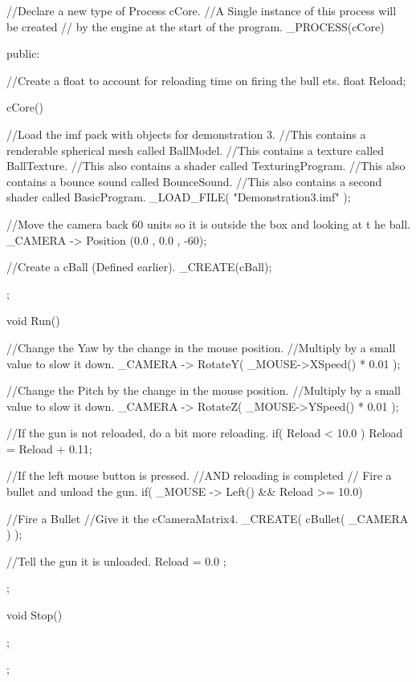 \begin{DoxyCode}
//Declare a new type of Process cCore.
//A Single instance of this process will be created
// by the engine at the start of the program.
_PROCESS(cCore)
{
public:

                //Create a float to account for reloading time on firing the bull
      ets.
        float Reload;

        cCore()
        {
        //Load the imf pack with objects for demonstration 3.
        //This contains a renderable spherical mesh called BallModel.
        //This contains a texture called BallTexture.
        //This also contains a shader called TexturingProgram.
        //This also contains a bounce sound called BounceSound.
        //This also contains a second shader called BasicProgram.
         _LOAD_FILE( "Demonstration3.imf" );

        //Move the camera back 60 units so it is outside the box and looking at t
      he ball.
        _CAMERA -> Position (0.0 , 0.0 , -60);

        //Create a cBall (Defined earlier).
         _CREATE(cBall);

        };

        void Run()
        {
                //Change the Yaw by the change in the mouse position.
                //Multiply by a small value to slow it down.
                _CAMERA -> RotateY( _MOUSE->XSpeed() * 0.01 );

                //Change the Pitch by the change in the mouse position.
                //Multiply by a small value to slow it down.
                _CAMERA -> RotateZ( _MOUSE->YSpeed() * 0.01 );

                //If the gun is not reloaded, do a bit more reloading.
                if( Reload < 10.0 ) { Reload = Reload + 0.11; }

                //If the left mouse button is pressed.
                //AND reloading is completed
                // Fire a bullet and unload the gun.
                if( _MOUSE -> Left() && Reload >= 10.0)
                {
                        //Fire a Bullet
                        //Give it the cCameraMatrix4.
                        _CREATE( cBullet( _CAMERA ) );

                        //Tell the gun it is unloaded.
                        Reload = 0.0 ;
                }
        };

        void Stop()
        {

        };


 };
\end{DoxyCode}
